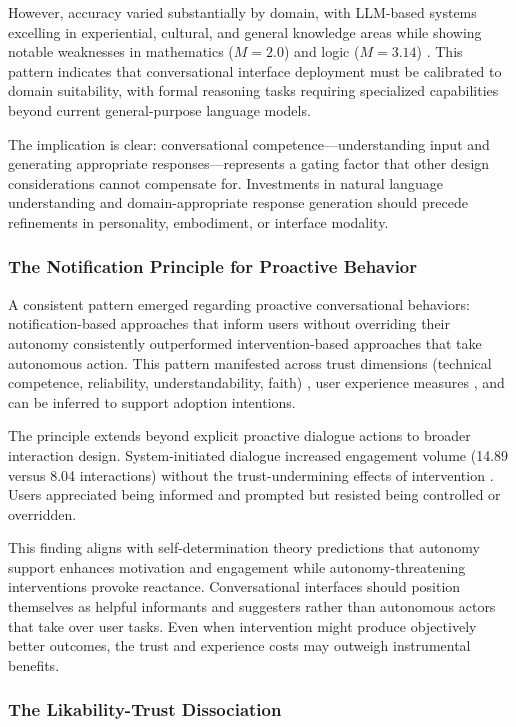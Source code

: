 \documentclass[manuscript,anonymous,sigconf]{acmart}
\begin{document}
However, accuracy varied substantially by domain, with LLM-based systems excelling in experiential, cultural, and general knowledge areas while showing notable weaknesses in mathematics ($M = 2.0$) and logic ($M = 3.14$) \cite{A81}. This pattern indicates that conversational interface deployment must be calibrated to domain suitability, with formal reasoning tasks requiring specialized capabilities beyond current general-purpose language models.

The implication is clear: conversational competence---understanding input and generating appropriate responses---represents a gating factor that other design considerations cannot compensate for. Investments in natural language understanding and domain-appropriate response generation should precede refinements in personality, embodiment, or interface modality.

\subsubsection{The Notification Principle for Proactive Behavior}

A consistent pattern emerged regarding proactive conversational behaviors: notification-based approaches that inform users without overriding their autonomy consistently outperformed intervention-based approaches that take autonomous action. This pattern manifested across trust dimensions (technical competence, reliability, understandability, faith) \cite{A16}, user experience measures \cite{A16}, and can be inferred to support adoption intentions.

The principle extends beyond explicit proactive dialogue actions to broader interaction design. System-initiated dialogue increased engagement volume (14.89 versus 8.04 interactions) without the trust-undermining effects of intervention \cite{A42}. Users appreciated being informed and prompted but resisted being controlled or overridden.

This finding aligns with self-determination theory predictions that autonomy support enhances motivation and engagement while autonomy-threatening interventions provoke reactance. Conversational interfaces should position themselves as helpful informants and suggesters rather than autonomous actors that take over user tasks. Even when intervention might produce objectively better outcomes, the trust and experience costs may outweigh instrumental benefits.

\subsubsection{The Likability-Trust Dissociation}
\end{document}
